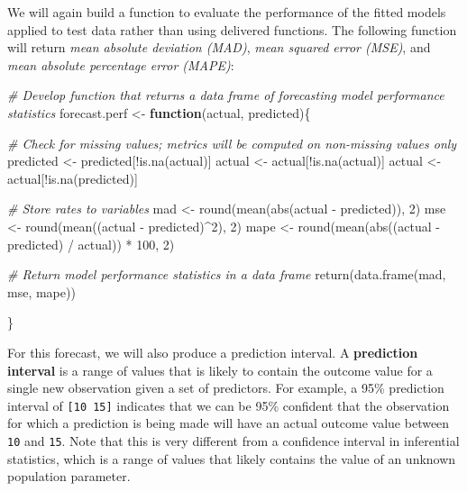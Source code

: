\documentclass[
]{book}
\newenvironment{Shaded}{\begin{snugshade}}{\end{snugshade}}
\newcommand{\CommentTok}[1]{\textcolor[rgb]{0.56,0.35,0.01}{\textit{#1}}}
\newcommand{\ControlFlowTok}[1]{\textcolor[rgb]{0.13,0.29,0.53}{\textbf{#1}}}
\newcommand{\DecValTok}[1]{\textcolor[rgb]{0.00,0.00,0.81}{#1}}
\newcommand{\FunctionTok}[1]{\textcolor[rgb]{0.00,0.00,0.00}{#1}}
\newcommand{\NormalTok}[1]{#1}
\newcommand{\OtherTok}[1]{\textcolor[rgb]{0.56,0.35,0.01}{#1}}
\newcommand{\SpecialCharTok}[1]{\textcolor[rgb]{0.00,0.00,0.00}{#1}}
\begin{document}
We will again build a function to evaluate the performance of the fitted models applied to test data rather than using delivered functions. The following function will return \emph{mean absolute deviation (MAD)}, \emph{mean squared error (MSE)}, and \emph{mean absolute percentage error (MAPE)}:

\begin{Shaded}
\begin{Highlighting}[]
\CommentTok{\# Develop function that returns a data frame of forecasting model performance statistics}
\NormalTok{forecast.perf }\OtherTok{\textless{}{-}} \ControlFlowTok{function}\NormalTok{(actual, predicted)\{}
  
  \CommentTok{\# Check for missing values; metrics will be computed on non{-}missing values only}
\NormalTok{  predicted }\OtherTok{\textless{}{-}}\NormalTok{ predicted[}\SpecialCharTok{!}\FunctionTok{is.na}\NormalTok{(actual)]}
\NormalTok{  actual }\OtherTok{\textless{}{-}}\NormalTok{ actual[}\SpecialCharTok{!}\FunctionTok{is.na}\NormalTok{(actual)]}
\NormalTok{  actual }\OtherTok{\textless{}{-}}\NormalTok{ actual[}\SpecialCharTok{!}\FunctionTok{is.na}\NormalTok{(predicted)]}
  
  \CommentTok{\# Store rates to variables}
\NormalTok{  mad }\OtherTok{\textless{}{-}} \FunctionTok{round}\NormalTok{(}\FunctionTok{mean}\NormalTok{(}\FunctionTok{abs}\NormalTok{(actual }\SpecialCharTok{{-}}\NormalTok{ predicted)), }\DecValTok{2}\NormalTok{)}
\NormalTok{  mse }\OtherTok{\textless{}{-}} \FunctionTok{round}\NormalTok{(}\FunctionTok{mean}\NormalTok{((actual }\SpecialCharTok{{-}}\NormalTok{ predicted)}\SpecialCharTok{\^{}}\DecValTok{2}\NormalTok{), }\DecValTok{2}\NormalTok{)}
\NormalTok{  mape }\OtherTok{\textless{}{-}} \FunctionTok{round}\NormalTok{(}\FunctionTok{mean}\NormalTok{(}\FunctionTok{abs}\NormalTok{((actual }\SpecialCharTok{{-}}\NormalTok{ predicted) }\SpecialCharTok{/}\NormalTok{ actual)) }\SpecialCharTok{*} \DecValTok{100}\NormalTok{, }\DecValTok{2}\NormalTok{)}
  
  \CommentTok{\# Return model performance statistics in a data frame}
  \FunctionTok{return}\NormalTok{(}\FunctionTok{data.frame}\NormalTok{(mad, mse, mape))}
  
\NormalTok{\}}
\end{Highlighting}
\end{Shaded}

For this forecast, we will also produce a prediction interval. A \textbf{prediction interval} is a range of values that is likely to contain the outcome value for a single new observation given a set of predictors. For example, a 95\% prediction interval of \texttt{{[}10\ 15{]}} indicates that we can be 95\% confident that the observation for which a prediction is being made will have an actual outcome value between \texttt{10} and \texttt{15}. Note that this is very different from a confidence interval in inferential statistics, which is a range of values that likely contains the value of an unknown population parameter.
\end{document}

